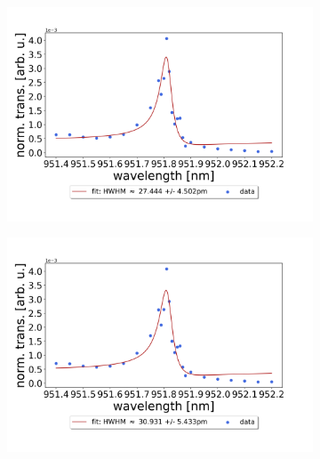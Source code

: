 \begin{figure}[h!]
    \centering
    \begin{subfigure}[b]{0.49\textwidth}
        \includegraphics[width=\textwidth]{figures/results/single fano fits/5um_M5_fit_1.png}
        \caption{}
        \label{fig:5um_M5_fit_1}
    \end{subfigure}
    \begin{subfigure}[b]{0.49\textwidth}
        \includegraphics[width=\textwidth]{figures/results/single fano fits/5um_M5_fit_2.png}
        \caption{}
        \label{fig:5um_M5_fit_2}
    \end{subfigure}
    \begin{subfigure}[b]{0.49\textwidth}

\end{subfigure}
\end{figure}
